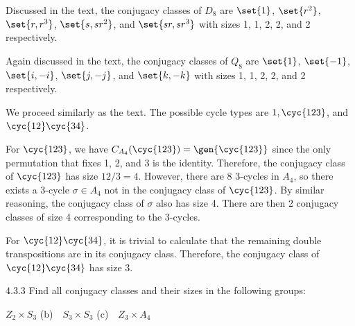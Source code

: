\begin{solenum}
	\item Discussed in the text, the conjugacy classes of $D_8$ are $\set{1}$, $\set{r^2}$, $\set{r, r^3}$, $\set{s, sr^2}$, and $\set{sr, sr^3}$ with sizes 1, 1, 2, 2, and 2 respectively.
	\item Again discussed in the text, the conjugacy classes of $Q_8$ are $\set{1}$, $\set{-1}$, $\set{i, -i}$, $\set{j, -j}$, and $\set{k, -k}$ with sizes 1, 1, 2, 2, and 2 respectively.
	\item We proceed similarly as the text.
	The possible cycle types are $1, \cyc{1 2 3}$, and $\cyc{1 2}\cyc{3 4}$.
	
	For $\cyc{1 2 3}$, we have $C_{A_4}(\cyc{1 2 3}) = \gen{\cyc{1 2 3}}$ since the only permutation that fixes 1, 2, and 3 is the identity.
	Therefore, the conjugacy class of $\cyc{1 2 3}$ has size $12/3 = 4$.
	However, there are 8 3-cycles in $A_4$, so there exists a 3-cycle $\sigma \in A_4$ not in the conjugacy class of $\cyc{1 2 3}$.
	By similar reasoning, the conjugacy class of $\sigma$ also has size 4.
	There are then 2 conjugacy classes of size 4 corresponding to the 3-cycles.

	For $\cyc{1 2}\cyc{3 4}$, it is trivial to calculate that the remaining double transpositions are in its conjugacy class.
	Therefore, the conjugacy class of $\cyc{1 2}\cyc{3 4}$ has size 3.
\end{solenum}

\begin{exercise}{4.3.3}
	Find all conjugacy classes and their sizes in the following groups:
	\begin{subexercises}
		\item $Z_2 \times S_3$ \quad (b)~~$S_3 \times S_3$ \quad (c)~~$Z_3 \times A_4$
	\end{subexercises}
\end{exercise}

